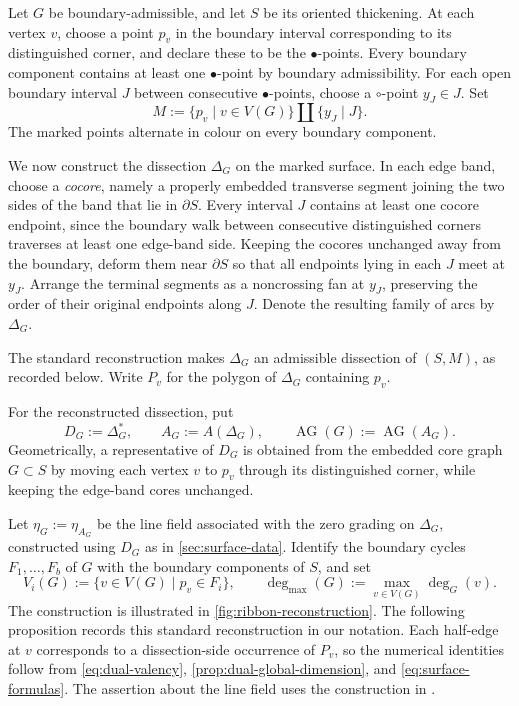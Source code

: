 \documentclass[11pt]{amsart}
\theoremstyle{definition}
\theoremstyle{plain}
\theoremstyle{definition}
\theoremstyle{definition}
\newcommand{\degmax}{\deg_{\max}}
\newcommand{\AG}{\operatorname{AG}}
\begin{document}
\smallskip
Let $G$ be boundary-admissible, and let $S$ be its oriented
thickening. At each vertex $v$, choose a point $p_v$ in the
boundary interval corresponding to its distinguished corner,
and declare these to be the $\bullet$-points. Every boundary
component contains at least one $\bullet$-point by boundary
admissibility. For each open boundary interval $J$ between
consecutive $\bullet$-points, choose a $\circ$-point $y_J\in J$.
Set
\[
  M:=\{p_v\mid v\in V(G)\}\amalg\{y_J\mid J\}.
\]
The marked points alternate in colour on every boundary component.

We now construct the dissection $\Delta_G$ on the marked surface. In each edge band,
choose a \emph{cocore}, namely a properly embedded transverse
segment joining the two sides of the band that lie in
$\partial S$. Every interval $J$ contains at least one cocore
endpoint, since the boundary walk between consecutive
distinguished corners traverses at least one edge-band side.
Keeping the cocores unchanged away from the boundary, deform
them near $\partial S$ so that all endpoints lying in each $J$
meet at $y_J$. Arrange the terminal segments as a noncrossing
fan at $y_J$, preserving the order of their original endpoints
along $J$. Denote the resulting family of arcs by $\Delta_G$.

The standard reconstruction makes $\Delta_G$ an admissible
dissection of $(S,M)$, as recorded below. Write $P_v$ for
the polygon of $\Delta_G$ containing $p_v$.

For the reconstructed dissection, put
\[
  D_G:=\Delta_G^*,\qquad
  A_G:=A(\Delta_G),\qquad
  \AG(G):=\AG(A_G).
\]
Geometrically, a representative of $D_G$ is obtained from the
embedded core graph $G\subset S$ by moving each vertex $v$
to $p_v$ through its distinguished corner, while keeping
the edge-band cores unchanged.

Let $\eta_G:=\eta_{A_G}$ be the line field associated with the
zero grading on $\Delta_G$, constructed using $D_G$ as in
\cref{sec:surface-data}.  Identify the boundary cycles
$F_1,\ldots,F_b$ of $G$ with the boundary components of $S$,
and set
\[
  V_i(G):=\{v\in V(G)\mid p_v\in F_i\},
  \qquad
  \degmax(G):=\max_{v\in V(G)}\deg_G(v).
\]
The construction is illustrated in \cref{fig:ribbon-reconstruction}.
The following proposition records this standard reconstruction
in our notation.  Each half-edge at $v$ corresponds to a
dissection-side occurrence of $P_v$, so the numerical identities
follow from \eqref{eq:dual-valency},
\cref{prop:dual-global-dimension}, and
\eqref{eq:surface-formulas}.  The assertion about the line field
uses the construction in
\cite[Section~3.3]{AmiotPlamondonSchroll}.
\end{document}
